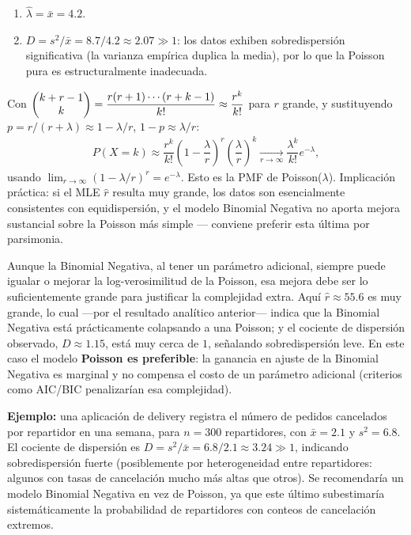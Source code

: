 \begin{solproblema}[prob:486b84f]
	\begin{enumerate}
		\item $\hat{\lambda} = \bar{x} = 4.2$.
		\item $D = s^2/\bar{x} = 8.7/4.2 \approx 2.07 \gg 1$: los datos exhiben sobredispersión significativa (la varianza empírica duplica la media), por lo que la Poisson pura es estructuralmente inadecuada.
	\end{enumerate}
\end{solproblema}

\begin{solproblema}[prob:8fd9d7f]
	Con $\begin{pmatrix} k+r-1 \\ k\end{pmatrix} = \dfrac{r(r+1)\cdots(r+k-1)}{k!} \approx \dfrac{r^k}{k!}$ para $r$ grande, y sustituyendo $p=r/(r+\lambda)\approx1-\lambda/r$, $1-p\approx\lambda/r$:
	\begin{align*}
		P(X=k) \approx \dfrac{r^k}{k!}\left(1-\dfrac{\lambda}{r}\right)^r\left(\dfrac{\lambda}{r}\right)^k \xrightarrow[r\to\infty]{} \dfrac{\lambda^k}{k!}e^{-\lambda},
	\end{align*}
	usando $\lim_{r\to\infty}(1-\lambda/r)^r=e^{-\lambda}$. Esto es la PMF de Poisson($\lambda$). Implicación práctica: si el MLE $\hat{r}$ resulta muy grande, los datos son esencialmente consistentes con equidispersión, y el modelo Binomial Negativa no aporta mejora sustancial sobre la Poisson más simple — conviene preferir esta última por parsimonia.
\end{solproblema}

\begin{solproblema}[prob:395bc31]
	Aunque la Binomial Negativa, al tener un parámetro adicional, siempre puede igualar o mejorar la log-verosimilitud de la Poisson, esa mejora debe ser lo suficientemente grande para justificar la complejidad extra. Aquí $\hat{r}\approx55.6$ es muy grande, lo cual —por el resultado analítico anterior— indica que la Binomial Negativa está prácticamente colapsando a una Poisson; y el cociente de dispersión observado, $D\approx1.15$, está muy cerca de $1$, señalando sobredispersión leve. En este caso el modelo \textbf{Poisson es preferible}: la ganancia en ajuste de la Binomial Negativa es marginal y no compensa el costo de un parámetro adicional (criterios como AIC/BIC penalizarían esa complejidad).
\end{solproblema}

\begin{solproblema}[prob:a28b8e6]
	\textbf{Ejemplo:} una aplicación de delivery registra el número de pedidos cancelados por repartidor en una semana, para $n=300$ repartidores, con $\bar{x}=2.1$ y $s^2=6.8$. El cociente de dispersión es $D=s^2/\bar{x}=6.8/2.1\approx3.24\gg1$, indicando sobredispersión fuerte (posiblemente por heterogeneidad entre repartidores: algunos con tasas de cancelación mucho más altas que otros). Se recomendaría un modelo Binomial Negativa en vez de Poisson, ya que este último subestimaría sistemáticamente la probabilidad de repartidores con conteos de cancelación extremos.
\end{solproblema}
